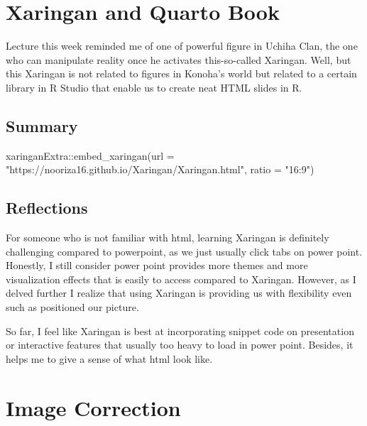 \documentclass[
  letterpaper,
  DIV=11,
  numbers=noendperiod]{scrreprt}
\newenvironment{Shaded}{\begin{snugshade}}{\end{snugshade}}
\newcommand{\AttributeTok}[1]{\textcolor[rgb]{0.40,0.45,0.13}{#1}}
\newcommand{\FunctionTok}[1]{\textcolor[rgb]{0.28,0.35,0.67}{#1}}
\newcommand{\NormalTok}[1]{\textcolor[rgb]{0.00,0.23,0.31}{#1}}
\newcommand{\SpecialCharTok}[1]{\textcolor[rgb]{0.37,0.37,0.37}{#1}}
\newcommand{\StringTok}[1]{\textcolor[rgb]{0.13,0.47,0.30}{#1}}
\begin{document}

\hypertarget{xaringan-and-quarto-book}{%
\chapter{Xaringan and Quarto Book}\label{xaringan-and-quarto-book}}

Lecture this week reminded me of one of powerful figure in Uchiha Clan,
the one who can manipulate reality once he activates this-so-called
Xaringan. Well, but this Xaringan is not related to figures in Konoha's
world but related to a certain library in R Studio that enable us to
create neat HTML slides in R.

\hypertarget{summary-1}{%
\section{Summary}\label{summary-1}}

\begin{Shaded}
\begin{Highlighting}[]
\NormalTok{xaringanExtra}\SpecialCharTok{::}\FunctionTok{embed\_xaringan}\NormalTok{(}\AttributeTok{url =} \StringTok{"https://nooriza16.github.io/Xaringan/Xaringan.html"}\NormalTok{, }\AttributeTok{ratio =} \StringTok{"16:9"}\NormalTok{)}
\end{Highlighting}
\end{Shaded}

\hypertarget{reflections}{%
\section{Reflections}\label{reflections}}

For someone who is not familiar with html, learning Xaringan is
definitely challenging compared to powerpoint, as we just usually click
tabs on power point. Honestly, I still consider power point provides
more themes and more visualization effects that is easily to access
compared to Xaringan. However, as I delved further I realize that using
Xaringan is providing us with flexibility even such as positioned our
picture.

So far, I feel like Xaringan is best at incorporating snippet code on
presentation or interactive features that usually too heavy to load in
power point. Besides, it helps me to give a sense of what html look
like.


\hypertarget{image-correction}{%
\chapter{Image Correction}\label{image-correction}}
\end{document}
